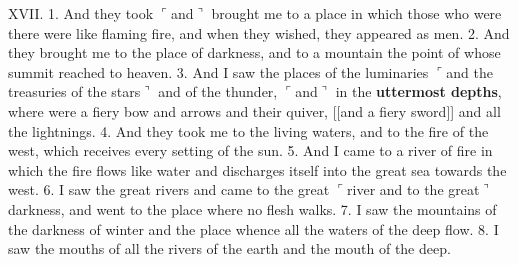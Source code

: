

XVII. 1. And they took $\ulcorner$and$\urcorner$ brought me to a
place in which those who were there were like flaming
fire, and when they wished, they appeared as men.
2. And they brought me to the place of darkness, and
to a mountain the point of whose summit reached to
heaven. 3. And I saw the places of the luminaries
$\ulcorner$and the treasuries of the stars$\urcorner$ and of the thunder,
$\ulcorner$and$\urcorner$ in the \textbf{uttermost depths}, where were a fiery
bow and arrows and their quiver, [[and a fiery sword]]
and all the lightnings. 4. And they took me to the
living waters, and to the fire of the west, which
receives every setting of the sun. 5. And I came to
a river of fire in which the fire flows like water and
discharges itself into the great sea towards the west.
6. I saw the great rivers and came to the great $\ulcorner$river
and to the great$\urcorner$ darkness, and went to the place
where no flesh walks. 7. I saw the mountains of the
darkness of winter and the place whence all the waters
of the deep flow. 8. I saw the mouths of all the
rivers of the earth and the mouth of the deep.

